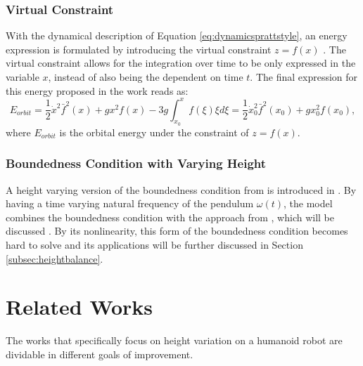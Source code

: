 \subsubsection{Virtual Constraint}
With the dynamical description of Equation \eqref{eq:dynamicsprattstyle}, an energy expression is formulated by introducing the virtual constraint $z=f(x)$ \cite{pratt2007derivation}. The virtual constraint allows for the integration over time to be only expressed in the variable $x$, instead of also being the dependent on time $t$. The final expression for this energy proposed in the work reads as:
\begin{equation}\label{eq:eorbit}
    E_{orbit}  = \frac{1}{2}\dot{x}^2\bar{f}^2(x)+gx^2f(x) - 3g\int_{x_0}^xf(\xi)\xi d\xi = \frac{1}{2}\dot{x}_0^2\bar{f}^2(x_0)+gx_0^2f(x_0),
\end{equation}
where $E_{orbit}$ is the orbital energy under the constraint of $z=f(x)$.

\subsubsection{Boundedness Condition with Varying Height}
A height varying version of the boundedness condition from \cite{lanari2014boundedness} is introduced in \cite{caron2018balance} . By having a time varying natural frequency of the pendulum $\omega(t)$, the model combines the boundedness condition with the approach from \cite{hopkins2014humanoid}, which will be discussed . By its nonlinearity, this form of the boundedness condition becomes hard to solve and its applications will be further discussed in Section \ref{subsec:heightbalance}.



\section{Related Works}\label{sec:relatedworksheight}
The works that specifically focus on height variation on a humanoid robot are dividable in different goals of improvement. 
